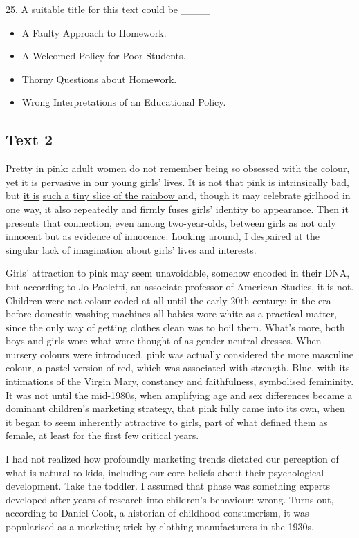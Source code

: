 \documentclass[UTF8,11pt]{ctexart}
\begin{document}
25. A suitable title for this text could be \_\_\_\_


\begin{itemize}[leftmargin=2em,itemsep=.2em,topsep=.4em]\item[A.] A Faulty Approach to Homework.
\item[B.] A Welcomed Policy for Poor Students.
\item[C.] Thorny Questions about Homework.
\item[D.] Wrong Interpretations of an Educational Policy.
\end{itemize}

\subsection*{\textbf{Text 2}}


Pretty in pink: adult women do not remember being so obsessed with the colour, yet it is pervasive in our young girls’ lives. It is not that pink is intrinsically bad, but \uline{it is} \uline{such a tiny slice of the rainbow }and, though it may celebrate girlhood in one way, it also repeatedly and firmly fuses girls’ identity to appearance. Then it presents that connection, even among two-year-olds, between girls as not only innocent but as evidence of innocence. Looking around, I despaired at the singular lack of imagination about girls’ lives and interests.


Girls’ attraction to pink may seem unavoidable, somehow encoded in their DNA, but according to Jo Paoletti, an associate professor of American Studies, it is not. Children were not colour-coded at all until the early 20th century: in the era before domestic washing machines all babies wore white as a practical matter, since the only way of getting clothes clean was to boil them. What’s more, both boys and girls wore what were thought of as gender-neutral dresses. When nursery colours were introduced, pink was actually considered the more masculine colour, a pastel version of red, which was associated with strength. Blue, with its intimations of the Virgin Mary, constancy and faithfulness, symbolised femininity. It was not until the mid-1980s, when amplifying age and sex differences became a dominant children’s marketing strategy, that pink fully came into its own, when it began to seem inherently attractive to girls, part of what defined them as female, at least for the first few critical years.


I had not realized how profoundly marketing trends dictated our perception of what is natural to kids, including our core beliefs about their psychological development. Take the toddler. I assumed that phase was something experts developed after years of research into children’s behaviour: wrong. Turns out, according to Daniel Cook, a historian of childhood consumerism, it was popularised as a marketing trick by clothing manufacturers in the 1930s.
\end{document}
